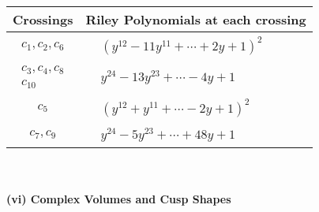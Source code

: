 \documentclass[1p]{elsarticle_modified}
\theoremstyle{definition}
\begin{document}
\begin{tabular}{m{50pt}|m{274pt}}
Crossings & \hspace{64pt}Riley Polynomials at each crossing \\
\hline $$\begin{aligned}c_{1},c_{2},c_{6}\end{aligned}$$&$\begin{aligned}
&(y^{12}-11 y^{11}+\cdots+2 y+1)^{2}
\end{aligned}$\\
\hline $$\begin{aligned}c_{3},c_{4},c_{8}\\c_{10}\end{aligned}$$&$\begin{aligned}
&y^{24}-13 y^{23}+\cdots-4 y+1
\end{aligned}$\\
\hline $$\begin{aligned}c_{5}\end{aligned}$$&$\begin{aligned}
&(y^{12}+y^{11}+\cdots-2 y+1)^{2}
\end{aligned}$\\
\hline $$\begin{aligned}c_{7},c_{9}\end{aligned}$$&$\begin{aligned}
&y^{24}-5 y^{23}+\cdots+48 y+1
\end{aligned}$\\
\hline
\end{tabular}\\~\\
\newpage\flushleft \textbf{(vi) Complex Volumes and Cusp Shapes}
\end{document}
